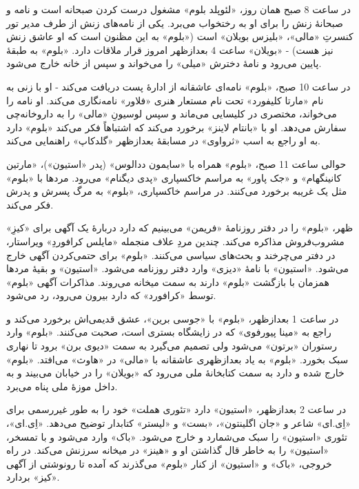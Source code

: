 \documentclass[12pt]{book}
\newcommand{\noun}[1]{«{#1}»}
\begin{document}
    در ساعت 8 صبح همان روز، \noun{لئوپلد بلوم} مشغول درست کردن صبحانه است و نامه و صبحانۀ زنش را برای او به رختخواب می‌برد. یکی از نامه‌های زنش از طرف مدیر تور کنسرتِ \noun{مالی}، \noun{بلیزس بویلان} است (\noun{بلوم} به این مظنون است که او عاشق زنش نیز هست) - \noun{بویلان} ساعت 4 بعدازظهر امروز قرار ملاقات دارد. \noun{بلوم} به طبقۀ پایین می‌رود و نامۀ دخترش \noun{میلی} را می‌خواند و سپس از خانه خارج می‌شود.

    در ساعت 10 صبح، \noun{بلوم} نامه‌ای عاشقانه از ادارۀ پست دریافت می‌کند - او با زنی به نام \noun{مارتا کلیفورد} تحت نام مستعار هنری \noun{فلاور} نامه‌نگاری می‌کند. او نامه را می‌خواند، مختصری در کلیسایی می‌ماند و سپس لوسیونِ \noun{مالی} را به داروخانه‌چی سفارش می‌دهد. او با \noun{بانتام لاینز} برخورد می‌کند که اشتباهاً فکر می‌کند \noun{بلوم} دارد به او راجع به اسب \noun{ثرواوی} در مسابقۀ بعدازظهر \noun{گلدکاپ} راهنمایی می‌کند.

    حوالی ساعت 11 صبح، \noun{بلوم} همراه با \noun{سایمون ددالوس} (پدر \noun{استیون})، \noun{مارتین کانینگهام} و \noun{جک پاور} به مراسم خاکسپاری \noun{پدی دیگنام} می‌رود. مردها با \noun{بلوم} مثل یک غریبه برخورد می‌کنند. در مراسم خاکسپاری، \noun{بلوم} به مرگ پسرش و پدرش فکر می‌کند.

    ظهر، \noun{بلوم} را در دفتر روزنامۀ \noun{فریمن} می‌بینیم که دارد دربارۀ یک آگهی برای \noun{کیزِ} مشروب‌فروش مذاکره می‌کند. چندین مردِ علاف منجمله \noun{مایلس کرافوردِ} ویراستار، در دفتر می‌چرخند و بحث‌های سیاسی می‌کنند. \noun{بلوم} برای حتمی‌کردن آگهی خارج می‌شود. \noun{استیون} با نامۀ \noun{دیزی} وارد دفتر روزنامه می‌شود. \noun{استیون} و بقیۀ مردها همزمان با بازگشت \noun{بلوم} دارند به سمت میخانه می‌روند. مذاکرات آگهی \noun{بلوم} توسط \noun{کرافورد} که دارد بیرون می‌رود، رد می‌شود.

    در ساعت 1 بعدازظهر، \noun{بلوم} با \noun{جوسی برین}، عشق قدیمی‌اش برخورد می‌کند و راجع به \noun{مینا پیورفوی} که در زایشگاه بستری است، صحبت می‌کنند. \noun{بلوم} وارد رستوران \noun{برتون} می‌شود ولی تصمیم می‌گیرد به سمت \noun{دیوی برن} برود تا نهاری سبک بخورد. \noun{بلوم} به یاد بعدازظهری عاشقانه با \noun{مالی} در \noun{هاوث} می‌افتد. \noun{بلوم} خارج شده و دارد به سمت کتابخانۀ ملی می‌رود که \noun{بویلان} را در خیابان می‌بیند و به داخل موزۀ ملی پناه می‌برد.

    در ساعت 2 بعدازظهر، \noun{استیون} دارد «تئوری هملت» خود را به طور غیررسمی برای \noun{اِی.ای} شاعر و \noun{جان اگلینتون}، \noun{بست} و \noun{لیستر} کتابدار توضیح می‌دهد. \noun{اِی.ای}، تئوری \noun{استیون} را سبک می‌شمارد و خارج می‌شود. \noun{باک} وارد می‌شود و با تمسخر، \noun{استیون} را به خاطر قال گذاشتن او و \noun{هینز} در میخانه سرزنش می‌کند. در راه خروجی، \noun{باک} و \noun{استیون} از کنار \noun{بلوم} می‌گذرند که آمده تا رونوشتی از آگهی \noun{کیز} بردارد.
\end{document}
